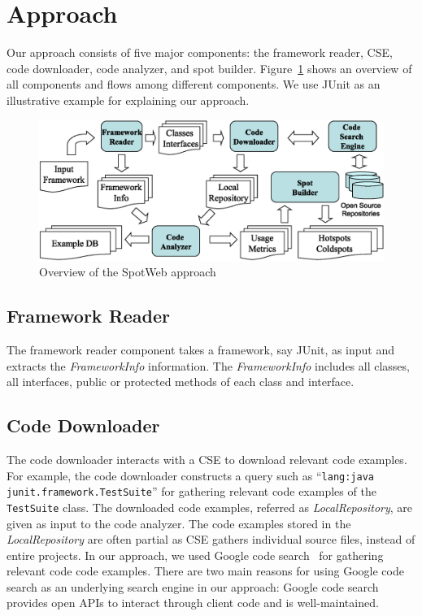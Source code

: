 \documentclass[conference]{IEEEtran}
\newcommand{\CodeIn}[1]{{\small\texttt{#1}}}
\begin{document}
\section{Approach}
\label{sec:specapproach}
Our approach consists of five major components:
the framework reader, CSE, code downloader, code
analyzer, and spot builder. Figure~\ref{fig:architecture} shows an overview of all components
and flows among different components. We use JUnit
as an illustrative example for explaining our approach. 
\begin{figure}[t]
\centering
\includegraphics[scale=0.38,clip]{Framework_overview1.eps}
\caption{Overview of the SpotWeb approach} \label{fig:architecture}
\end{figure}
\subsection{Framework Reader} 
The framework reader component
takes a framework, say JUnit, as input and extracts the \emph{FrameworkInfo}
information. The \emph{FrameworkInfo} includes all classes, all interfaces, public
or protected methods of each class and interface.
\subsection{Code Downloader} 
The code downloader interacts with a CSE to download relevant code examples. 
For example, the code downloader constructs
a query such as ``\CodeIn{lang:java junit.framework.TestSuite}'' for
gathering relevant code examples of the \CodeIn{TestSuite} class.
The downloaded code examples, referred as \emph{LocalRepository}, are given as input
to the code analyzer. The code examples stored in the \emph{LocalRepository}
are often partial as CSE gathers individual source files,
instead of entire projects. In our approach, we used Google code search~\cite{GCSE}
for gathering relevant code code examples. There are two main reasons
for using Google code search as an underlying search engine in our approach: Google code search
provides open APIs to interact through client code and is well-maintained.
\end{document}
